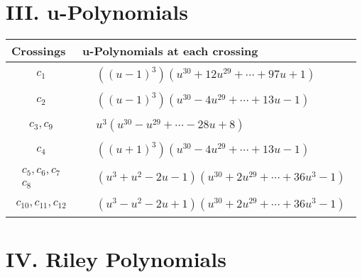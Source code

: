 \documentclass[1p]{elsarticle_modified}
\theoremstyle{definition}
\begin{document}
\newpage\renewcommand{\arraystretch}{1}
\centering \section*{ III. u-Polynomials}
\begin{tabular}{m{50pt}|m{274pt}}
Crossings & \hspace{64pt}u-Polynomials at each crossing \\
\hline $$\begin{aligned}c_{1}\end{aligned}$$&$\begin{aligned}
&((u-1)^3)(u^{30}+12 u^{29}+\cdots+97 u+1)
\end{aligned}$\\
\hline $$\begin{aligned}c_{2}\end{aligned}$$&$\begin{aligned}
&((u-1)^3)(u^{30}-4 u^{29}+\cdots+13 u-1)
\end{aligned}$\\
\hline $$\begin{aligned}c_{3},c_{9}\end{aligned}$$&$\begin{aligned}
&u^3(u^{30}- u^{29}+\cdots-28 u+8)
\end{aligned}$\\
\hline $$\begin{aligned}c_{4}\end{aligned}$$&$\begin{aligned}
&((u+1)^3)(u^{30}-4 u^{29}+\cdots+13 u-1)
\end{aligned}$\\
\hline $$\begin{aligned}c_{5},c_{6},c_{7}\\c_{8}\end{aligned}$$&$\begin{aligned}
&(u^3+u^2-2 u-1)(u^{30}+2 u^{29}+\cdots+36 u^3-1)
\end{aligned}$\\
\hline $$\begin{aligned}c_{10},c_{11},c_{12}\end{aligned}$$&$\begin{aligned}
&(u^3- u^2-2 u+1)(u^{30}+2 u^{29}+\cdots+36 u^3-1)
\end{aligned}$\\
\hline
\end{tabular}\newpage\renewcommand{\arraystretch}{1}
\centering \section*{ IV. Riley Polynomials}
\end{document}
